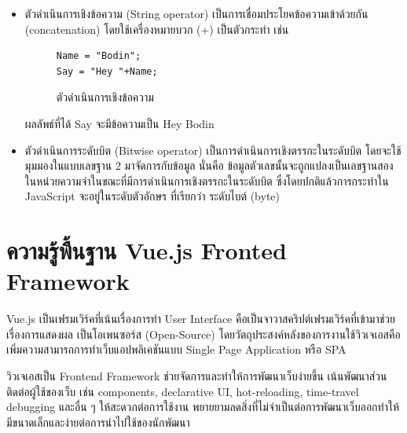 \begin{enumerate}
\begin{itemize}
			 			 \item ตัวดำเนินการเชิงข้อความ (String operator) เป็นการเชื่อมประโยคข้อความเข้าด้วยกัน (concatenation) โดยใช้เครื่องหมายบวก (+) เป็นตัวกระทำ
			 			 เช่น 
		 	 		 			\begin{figure}[H]
		 	 		 				{\begin{lstlisting}
Name = "Bodin";
Say = "Hey "+Name;
		 	 		 					\end{lstlisting}}
		 	 		 				\caption{ตัวดำเนินการเชิงข้อความ}
		 	 		 				\label{Fig:ตัวดำเนินการเชิงข้อความ}
		 	 		 			\end{figure}	
			 			 ผลลัพธ์ที่ได้ Say จะมีข้อความเป็น Hey Bodin
			 			 
			 			 \item ตัวดำเนินการระดับบิต (Bitwise operator) เป็นการดำเนินการเชิงตรรกะในระดับบิต โดยจะใช้มุมมองในแบบเลขฐาน 2 มาจัดการกับข้อมูล นั่นคือ ข้อมูลตัวเลขนั้นจะถูกแปลงเป็นเลขฐานสองในหน่วยความจำในขณะที่มีการดำเนินการเชิงตรรกะในระดับบิต ซึ่งโดยปกติแล้วการกระทำใน JavaScript จะอยู่ในระดับตัวอักษร ที่เรียกว่า ระดับไบต์ (byte) 
			 \end{itemize}
	 \end{enumerate}
	 
	 \section{ความรู้พื้นฐาน Vue.js Fronted Framework}
		Vue.js \cite{vuejs} เป็นเฟรมเวิร์คที่เน้นเรื่องการทำ User Interface คือเป็นจาวาสคริปต์เฟรมเวิร์คที่เข้ามาช่วยเรื่องการแสดงผล เป็นโอเพนซอร์ส (Open-Source)  โดยวัตถุประสงค์หลังของการงานใช้วิวเจเอสคือ เพิ่มความสามารถการทำเว็บแอปพลิเคชันแบบ Single Page Application หรือ SPA 

		วิวเจเอสเป็น Frontend Framework ช่วยจัดการและทำให้การพัฒนาเว็บง่ายขึ้น เน้นพัฒนาส่วนติดต่อผู้ใช้ของเว็บ เช่น components, declarative UI, hot-reloading, time-travel debugging และอื่น ๆ ให้สะดวกต่อการใช้งาน พยายยามลดสิ่งที่ไม่จำเป็นต่อการพัฒนาเว็บออกทำให้มีขนาดเล็กและง่ายต่อการนำไปใช้ของนักพัฒนา 
		
